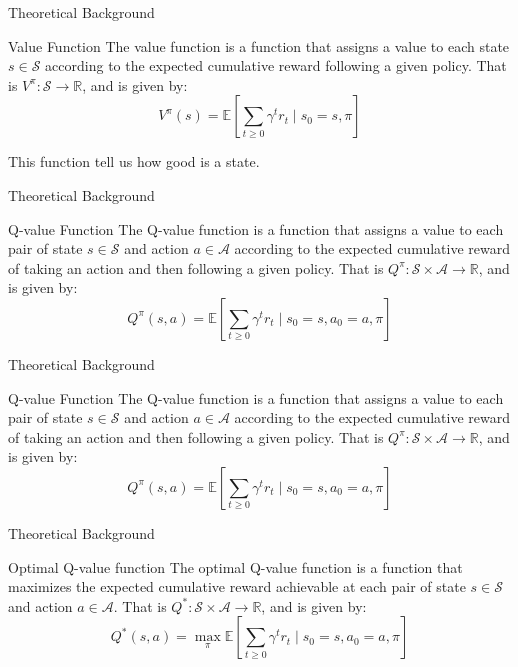 \documentclass{beamer}
\begin{document}
	\begin{frame}{Theoretical Background}
		\begin{block}{Value Function}
			The value function is a function that assigns a value to each state $ s \in \mathcal{S} $ according to the expected cumulative reward following a given policy. That is $ V^{\pi}:\mathcal{S} \to \mathbb{R} $, and is given by:
			$$ V^\pi(s) = \mathbb{E} \left[ \sum_{t\geq0}\gamma^t r_t  \mid s_0 = s,\pi \right] $$
		\end{block}
		This function tell us how good is a state.
	\end{frame}
	
	\begin{frame}{Theoretical Background}
		\begin{block}{Q-value Function}
			The Q-value function is a function that assigns a value to each pair of state $ s \in \mathcal{S} $ and action $ a \in \mathcal{A} $ according to the expected cumulative reward of taking an action and then following a given policy. That is $ Q^{\pi}:\mathcal{S}\times \mathcal{A} \to \mathbb{R} $, and is given by:
			$$ Q^\pi(s,a) = \mathbb{E} \left[ \sum_{t\geq0}\gamma^t r_t  \mid s_0 = s,a_0=a,\pi \right] $$
		\end{block}
	\end{frame}
	
	\begin{frame}{Theoretical Background}
		\begin{block}{Q-value Function}
			The Q-value function is a function that assigns a value to each pair of state $ s \in \mathcal{S} $ and action $ a \in \mathcal{A} $ according to the expected cumulative reward of taking an action and then following a given policy. That is $ Q^{\pi}:\mathcal{S}\times \mathcal{A} \to \mathbb{R} $, and is given by:
			$$ Q^\pi(s,a) = \mathbb{E} \left[ \sum_{t\geq0}\gamma^t r_t  \mid s_0 = s,a_0=a,\pi \right] $$
		\end{block}
	\end{frame}
	
	\begin{frame}{Theoretical Background}
		\begin{block}{Optimal Q-value function}
			The optimal Q-value function is a function that maximizes the expected cumulative reward achievable at each pair of state $ s \in \mathcal{S} $ and action $ a \in \mathcal{A} $. That is $ Q^*:\mathcal{S}\times \mathcal{A} \to \mathbb{R} $, and is given by:
			$$ Q^*(s,a) = \max_\pi \mathbb{E} \left[ \sum_{t\geq0}\gamma^t r_t  \mid s_0 = s,a_0=a,\pi \right] $$
		\end{block}
	\end{frame}
	
\end{document}
